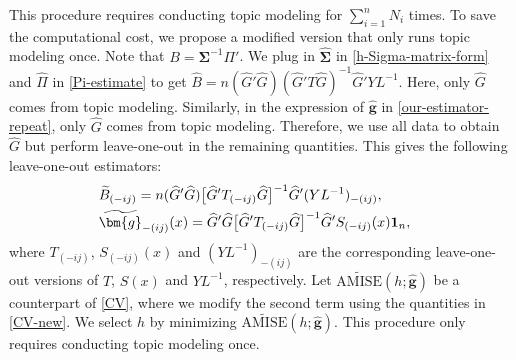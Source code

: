 \documentclass[preprint,11pt]{article}
\numberwithin{equation}{section}
\begin{document}
This procedure requires conducting topic modeling for $\sum_{i=1}^nN_i$ times. To save the computational cost, we propose a modified version that only runs topic modeling once. 
Note that $B=\boldsymbol{\Sigma}^{-1}\Pi'$. We plug in $\widehat{\boldsymbol{\Sigma}}$ in \eqref{h-Sigma-matrix-form} and $\widehat{\Pi}$ in \eqref{Pi-estimate} to get $\widehat{B}=n(\widehat{G}'\widehat{G})(\widehat{G}'T\widehat{G})^{-1}\widehat{G}'YL^{-1}$.
Here, only $\widehat{G}$ comes from topic modeling. Similarly, in the expression of $\widehat{\bm{g}}$ in \eqref{our-estimator-repeat}, only $\widehat{G}$ comes from topic modeling. Therefore, we use all data to obtain $\widehat{G}$ but perform leave-one-out in the remaining quantities. This gives the following leave-one-out estimators:
\begin{align} \label{CV-new}
& \widetilde{B}_{(-ij)} =n(\widehat{G}'\widehat{G})\bigl[\widehat{G}'T_{(-ij)}\widehat{G}\bigr]^{-1}\widehat{G}'(YL^{-1})_{-(ij)}, \cr
& \widetilde{\bm{g}}_{-(ij)}(x) = \widehat{G}'\widehat{G}\bigl[\widehat{G}'T_{(-ij)}\widehat{G}\bigr]^{-1}\widehat{G}'S_{(-ij)}(x) {\bf 1}_n,
\end{align}
where $T_{(-ij)}$, $S_{(-ij)}(x)$ and $(YL^{-1})_{-(ij)}$ are the corresponding leave-one-out versions of $T$, $S(x)$ and $YL^{-1}$, respectively. 
Let $\widetilde{\text{AMISE}}(h; \widehat{\bm{g}})$ be a counterpart of \eqref{CV}, where we modify  the second term using the quantities in \eqref{CV-new}. 
We select $h$ by minimizing $\widetilde{\text{AMISE}}(h; \widehat{\bm{g}})$. 
This procedure only requires conducting topic modeling once. 






\end{document}
